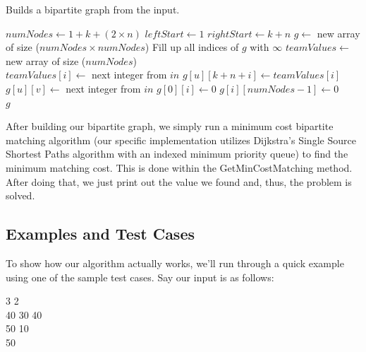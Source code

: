 \documentclass[12pt]{article}
\begin{document}
\begin{algorithm}[H]
\caption{Builds a bipartite graph from the input.}
\begin{algorithmic}
        \State $numNodes \gets 1 + k + (2 \times n)$
        \State $leftStart \gets 1$
        \State $rightStart \gets k + n$
        \State $g \gets$ new array of size ($numNodes \times numNodes$)
        \State Fill up all indices of $g$ with $\infty$
        \State $teamValues \gets$ new array of size ($numNodes$)
        \\
        \For{$i \in [0, numNodes)$}
            \State $teamValues[i] \gets$ next integer from $in$
        \EndFor
            \For{$i \in [0, n)$}
                \State $g[u][k + n + i] \gets teamValues[i]$
            \EndFor
        \EndFor
        \For{$u \in [leftStart + k, rightStart)$}
            \For{$v \in [u + n, numNodes - 1)$}
                \State $g[u][v] \gets$ next integer from $in$
            \EndFor
        \EndFor
        \For{$i \in [leftStart, rightStart)$}
            \State $g[0][i] \gets 0$
        \EndFor
        \For{$i \in [rightStart, numNodes - 1)$}
            \State $g[i][numNodes - 1] \gets 0$
        \EndFor
        \\
        \State \Return $g$
    \EndProcedure
\end{algorithmic}
\end{algorithm}

After building our bipartite graph, we simply run a minimum cost
bipartite matching algorithm (our specific implementation utilizes
Dijkstra's Single Source Shortest Paths algorithm with an indexed
minimum priority queue) to find the minimum matching cost. This is
done within the {\sc GetMinCostMatching} method. After doing that,
we just print out the value we found and, thus, the problem is solved.

\subsection{Examples and Test Cases}

To show how our algorithm actually works, we'll run through a quick
example using one of the sample test cases. Say our input is as
follows:

\begin{center}
    3 2 \\
    40 30 40 \\
    50 10 \\
    50
\end{center}
\end{document}
